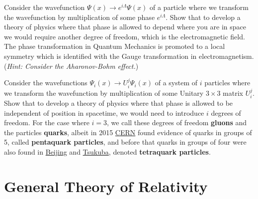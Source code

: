 \documentclass{article}
\begin{document}
 	\begin{exe}
 		Consider the wavefunction $\Psi (x) \to e^{i \Lambda} \Psi (x)$ of a particle where we transform the wavefunction by multiplication of some phase $e^{i\Lambda}$. Show that to develop a theory of physics where that phase is allowed to depend where you are in space we would require another degree of freedom, which is the electromagnetic field. The phase transformation in Quantum Mechanics is promoted to a local symmetry which is identified with the Gauge transformation in electromagnetism. (\textit{Hint: Consider the Aharonov-Bohm effect.})
 	\end{exe}
 	\begin{exe}
 		Consider the wavefunctions $\Psi_i (x) \to U_i^j \Psi_i (x)$ of a system of $i$ particles where we transform the wavefunction by multiplication of some Unitary $3 \times 3$ matrix $U^j_i$. Show that to develop a theory of physics where that phase is allowed to be independent of position in spacetime, we would need to introduce $i$ degrees of freedom. For the case where $i=3$, we call these degrees of freedom \textbf{gluons} and the particles \textbf{quarks}, albeit in 2015 \href{https://journals.aps.org/prl/abstract/10.1103/PhysRevLett.115.072001}{CERN} found evidence of quarks in groups of 5, called \textbf{pentaquark particles}, and before that quarks in groups of four were also found in \href{https://journals.aps.org/prl/abstract/10.1103/PhysRevLett.110.252001}{Beijing} and \href{https://journals.aps.org/prl/abstract/10.1103/PhysRevLett.110.252002}{Tsukuba}, denoted \textbf{tetraquark particles}.
 	\end{exe}
 	
 	\pagebreak
 	\section{General Theory of Relativity}
\end{document}
